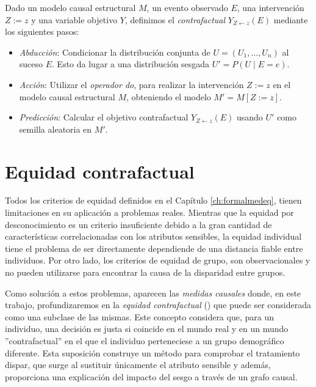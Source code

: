\documentclass[oneside,openright,titlepage,numbers=noenddot,openany,headinclude,footinclude=true,
cleardoublepage=empty,abstractoff,BCOR=5mm,paper=a4,fontsize=12pt,main=spanish]{scrreprt}
\begin{document}
\begin{definition} \label{def:pasoscontra}
Dado un modelo causal estructural $M$, un evento observado $E$, una intervención $Z := z$ y una variable objetivo $Y$, definimos el \textit{contrafactual} $Y_{Z \leftarrow z}(E)$ mediante los siguientes pasos:

\begin{itemize}
    \item \textit{Abducción}: Condicionar la distribución conjunta de $U = (U_1,\dots,U_n)$ al suceso $E$. Esto da lugar a una distribución sesgada $U'=P(U \mid E=e)$.
    \item \textit{Acción}: Utilizar el \textit{operador do}, para realizar la intervención $Z := z$ en el modelo causal estructural $M$, obteniendo el modelo $M' = M[Z := z]$.
    \item \textit{Predicción}: Calcular el objetivo contrafactual $Y_{Z \leftarrow z}(E)$ usando $U'$ como semilla aleatoria en $M'$.
\end{itemize}
\end{definition}


\section{Equidad contrafactual}

Todos los criterios de equidad definidos en el Capítulo \ref{ch:formalmedeq}, tienen limitaciones en su aplicación a problemas reales. Mientras que la equidad por desconocimiento es un criterio insuficiente debido a la gran cantidad de características correlacionadas con los atributos sensibles, la equidad individual tiene el problema de ser directamente dependiende de una distancia fiable entre individuos. Por otro lado, los criterios de equidad de grupo, son observacionales y no pueden utilizarse para encontrar la causa de la disparidad entre grupos. 

Como solución a estos problemas, aparecen las \textit{medidas causales} donde, en este trabajo, profundizaremos en la \textit{equidad contrafactual} (\cite{worlds2017}) que puede ser considerada como una subclase de las mismas. Este concepto considera que, para un individuo, una decisión es justa si coincide en el mundo real y en un mundo ''contrafactual'' en el que el individuo perteneciese a un grupo demográfico diferente. Esta suposición construye un método para comprobar el tratamiento dispar, que surge al sustituir únicamente el atributo sensible y además, proporciona una explicación del impacto del sesgo a través de un grafo causal.\\
\end{document}
